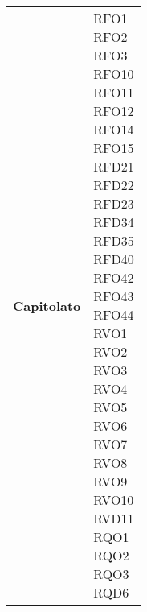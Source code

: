 \begin{longtable}[H]{| >{\centering\bfseries}p{8cm} | >{\centering\arraybackslash}p{8cm} |}
    Capitolato & 
        \makecell{
            RFO1 \\ 
            RFO2 \\ 
            RFO3 \\ 
            RFO10 \\
            RFO11 \\ 
            RFO12 \\ 
            RFO14 \\ 
            RFO15 \\
            RFD21 \\
            RFD22 \\
            RFD23 \\
            RFD34 \\
            RFD35 \\
            RFD40 \\
            RFO42 \\
            RFO43 \\
            RFO44 \\
            RVO1 \\
            RVO2 \\
            RVO3 \\
            RVO4 \\
            RVO5 \\
            RVO6 \\
            RVO7 \\
            RVO8 \\
            RVO9 \\
            RVO10 \\
            RVD11 \\
            RQO1 \\
            RQO2 \\
            RQO3 \\
            RQD6
        } \\


\end{longtable}
